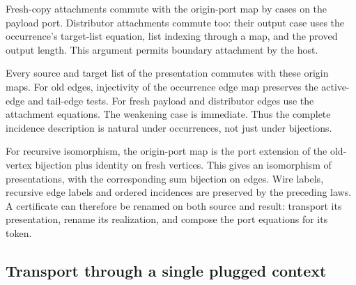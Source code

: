 

Fresh-copy attachments commute with the origin-port map by cases on the
payload port. Distributor attachments commute too: their output case uses the
occurrence's target-list equation, list indexing through a map, and the proved
output length. This argument permits boundary attachment by the host.



Every source and target list of the presentation commutes with these origin
maps. For old edges, injectivity of the occurrence edge map preserves the
active-edge and tail-edge tests. For fresh payload and distributor edges use
the attachment equations. The weakening case is immediate. Thus the complete
incidence description is natural under occurrences, not just under bijections.



For recursive isomorphism, the origin-port map is the port extension of the
old-vertex bijection plus identity on fresh vertices. This gives an isomorphism
of presentations, with the corresponding sum bijection on edges. Wire labels,
recursive edge labels and ordered incidences are preserved by the preceding
laws. A certificate can therefore be renamed on both source and result:
transport its presentation, rename its realization, and compose the port
equations for its token.




\subsection{Transport through a single plugged context}

